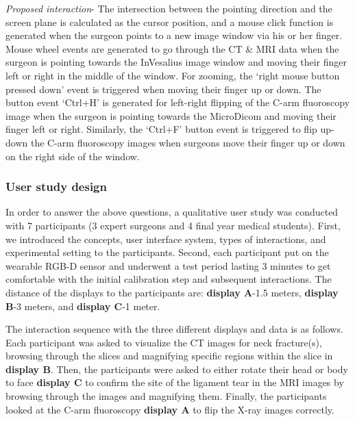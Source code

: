 \textit{Proposed interaction}- The intersection between the pointing direction and the screen plane is calculated as the cursor position, and a mouse click function is generated when the surgeon points to a new image window via his or her finger. Mouse wheel events are generated to go through the CT \& MRI data when the surgeon is pointing towards the InVesalius image window and moving their finger left or right in the middle of the window. For zooming, the `right mouse button pressed down' event is triggered when moving their finger up or down. The button event `Ctrl+H' is generated for left-right flipping of the C-arm fluoroscopy image when the surgeon is pointing towards the MicroDicom and moving their finger left or right. Similarly, the `Ctrl+F' button event is triggered to flip up-down the C-arm fluoroscopy images when surgeons move their finger up or down on the right side of the window.

\subsubsection{User study design}
In order to answer the above questions, a qualitative user study was conducted with 7 participants (3 expert surgeons and 4 final year medical students). First, we introduced the concepts, user interface system, types of interactions, and experimental setting to the participants. Second, each participant put on the wearable RGB-D sensor and underwent a test period lasting 3 minutes to get comfortable with the initial calibration step and subsequent interactions. The distance of the displays to the participants are: \textbf{display A}-1.5 meters, \textbf{display B}-3 meters, and \textbf{display C}-1 meter.

The interaction sequence with the three different displays and data is as follows. Each participant was asked to visualize the CT images for neck fracture(s), browsing through the slices and magnifying specific regions within the slice in \textbf{display B}. Then, the participants were asked to either rotate their head or body to face \textbf{display C} to confirm the site of the ligament tear in the MRI images by browsing through the images and magnifying them. Finally, the participants looked at the C-arm fluoroscopy \textbf{display A} to flip the X-ray images correctly.
